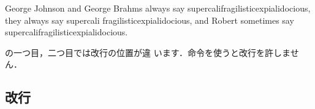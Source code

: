 {\begin{InTeX}
\end{InTeX}

\begin{InOut}
George Johnson and George Brahms 
always say 
supercalifragilisticexpialidocious,
they always say super\-cali\-
fragilistic\-expiali\-docious, and 
Robert sometimes say \mbox
{supercalifragilisticexpialidocious}.
\end{InOut}

の一つ目，二つ目では改行の位置が違
います．命令を使うと改行を許しません．%
%

\subsection{改行}

}
